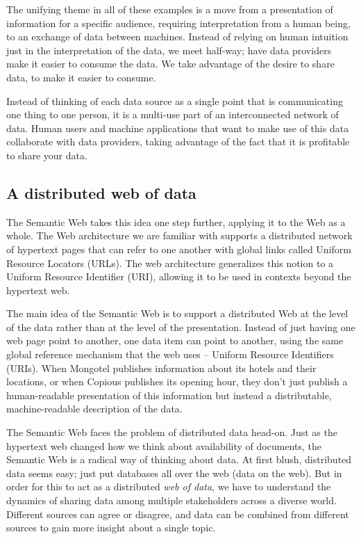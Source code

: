 The unifying theme in all of these examples is a move from a presentation of information 
for a specific audience, requiring interpretation from a human being, to an exchange of data
between machines.  Instead of relying on human intuition just in the interpretation of the
data, we meet half-way; have data providers make it easier to consume the data.  We take advantage of 
the desire to share data, to make it easier to consume. 

Instead of thinking of each data source as a single point that is communicating one thing 
to one person, it is a multi-use part of an interconnected network of data.   Human users and 
machine applications that want to make use of this data collaborate with data providers, taking 
advantage of the fact that it is profitable to share your data.

\subsection{A distributed web of data}




The Semantic Web takes this idea one step further, applying it to the
Web as a whole. The Web architecture we are familiar with supports a distributed
network of hypertext pages that can refer to one another with global links
called Uniform Resource Locators (URLs).  The web architecture generalizes this notion
to a Uniform Resource Identifier (URI), allowing it to be used in contexts beyond the 
hypertext web. 

The main idea of the Semantic Web is to support a distributed Web at the
level of the data rather than at the level of the presentation. Instead
of just having one web page point to another, one data item can point to
another, using the same global reference mechanism that the web uses -- Uniform
Resource Identifiers (URIs).   When Mongotel publishes information about its hotels and
their locations, or when Copious publishes its opening hour, they don't
just publish a human-readable presentation
of this information but instead a distributable, machine-readable
description of the data. 

The Semantic Web faces the problem of distributed data head-on.  Just as 
the hypertext web changed how we think about availability of documents, 
the Semantic Web is a radical way of thinking about data.  At first blush,
distributed data seems easy; just put databases all over the web (data on the web).
But in order for this to act as a distributed \emph{web of data},  we have 
to understand the dynamics of sharing data among multiple stakeholders across
a diverse world.   Different sources can agree or disagree, and data  can be 
combined from different sources to gain more insight about a single topic. 

